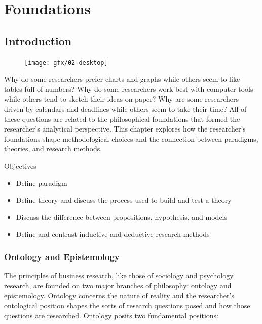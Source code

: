 \chapter{Foundations}\label{02:foundations}
\section{Introduction}

\begin{figure}
	\label{02:fig01} 
	\centering
	\texttt{[image: gfx/02-desktop]} 
\end{figure}
Why do some researchers prefer charts and graphs while others seem to like tables full of numbers? Why do some researchers work best with computer tools while others tend to sketch their ideas on paper? Why are some researchers driven by calendars and deadlines while others seem to take their time? All of these questions are related to the philosophical foundations that formed the researcher's analytical perspective. This chapter explores how the researcher's foundations shape methodological choices and the connection between paradigms, theories, and research methods.

\begin{center}
	\begin{objbox}{Objectives}
		\begin{itemize}
			\setlength{\itemsep}{0pt}
			\setlength{\parskip}{0pt}
			\setlength{\parsep}{0pt}
			
			\item Define paradigm
			\item Define theory and discuss the process used to build and test a theory
			\item Discuss the difference between propositions, hypothesis, and models
			\item Define and contrast inductive and deductive research methods
		\end{itemize}
	\end{objbox}
\end{center}


\subsection{Ontology and Epistemology}

The principles of business research, like those of sociology and psychology research, are founded on two major branches of philosophy: \gls{ontology} and \gls{epistemology}. Ontology concerns the nature of reality and the researcher's ontological position shapes the sorts of research questions posed and how those questions are researched. Ontology posits two fundamental positions:

